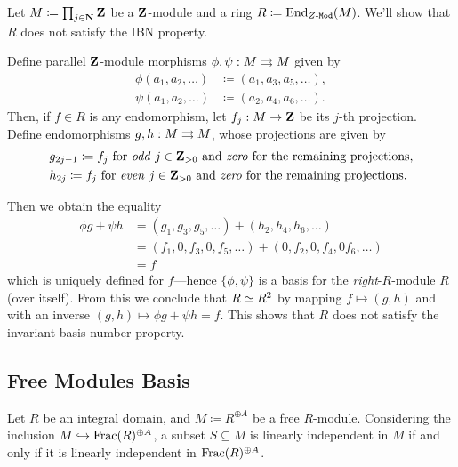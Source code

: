 \begin{example}
    \label{exp:End(Zinfty)-not-IBM}
    Let \(M \coloneq \prod_{j \in \mathbf{N}} \mathbf{Z}\) be a \(\mathbf{Z}\)-module and a ring
    \(R \coloneq \operatorname{End}_{{Z\text{-}\texttt{Mod}}}(M)\). We'll show that \(R\) does not satisfy the IBN
    property.

    Define parallel \(\mathbf{Z}\)-module morphisms \(\phi, \psi: M \rightrightarrows M\) given by
    \begin{align*}
        \phi(a_1, a_2, \dots) & \coloneq (a_1, a_3, a_5,\dots), \\
        \psi(a_1, a_2, \dots) & \coloneq (a_2, a_4, a_6,\dots).
    \end{align*}
    Then, if \(f \in R\) is any endomorphism, let \(f_j: M \to \mathbf{Z}\) be its \(j\)-th
    projection. Define endomorphisms \(g, h: M \rightrightarrows M\), whose projections are
    given by
    \begin{align*}
         & g_{2j - 1} \coloneq f_j\ \text{for \emph{odd}}\
        j \in \mathbf{Z}_{> 0}\ \text{and \emph{zero} for the remaining projections,} \\
         & h_{2j} \coloneq f_j\ \text{for \emph{even}}\
        j \in \mathbf{Z}_{> 0}\ \text{and \emph{zero} for the remaining projections.}
    \end{align*}

    Then we obtain the equality
    \begin{align*}
        \phi g + \psi h
         & = (g_1, g_3, g_5, \dots) + (h_2, h_4, h_6, \dots) \\
         & = (f_1, 0, f_3, 0, f_5, \dots)
        + (0, f_2, 0, f_4, 0 f_6, \dots)                     \\
         & = f
    \end{align*}
    which is uniquely defined for \(f\)---hence \(\{\phi, \psi\}\) is a basis for
    the \emph{right}-\(R\)-module \(R\) (over itself). From this we conclude that
    \(R \simeq R^2\) by mapping \(f \mapsto (g, h)\) and with an inverse
    \((g, h) \mapsto \phi g + \psi h = f\). This shows that \(R\) does not satisfy
    the invariant basis number property.
\end{example}

\subsection{Free Modules Basis}

\begin{lemma}
    \label{lem:LI-in-free-iff-LI-in-free-over-field-of-fractions}
    Let \(R\) be an integral domain, and \(M \coloneq R^{\oplus A}\) be a free
    \(R\)-module. Considering the inclusion \(M \hookrightarrow \operatorname{Frac}(R)^{\oplus A}\), a subset
    \(S \subseteq M\) is linearly independent in \(M\) if and only if it is linearly
    independent in \(\operatorname{Frac}(R)^{\oplus A}\).
\end{lemma}

